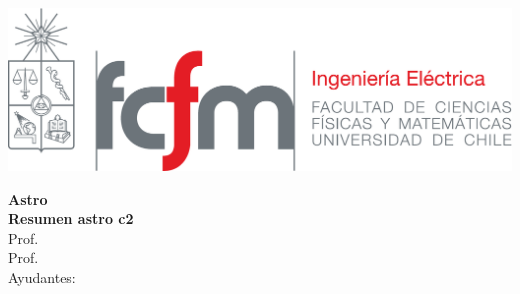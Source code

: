 \documentclass[
  11pt,
  letterpaper,
  answers
]{exam}
\begin{document}
\begin{minipage}{0.42\textwidth}
    \includegraphics[width=\textwidth]{../fcfm_die}
\end{minipage}
\begin{minipage}{0.53\textwidth}
\begin{center} 
\large\textbf{Astro}  \\
\large\textbf{Resumen astro c2} \\
\normalsize Prof.~\\
\normalsize Prof.~\\
\normalsize Ayudantes: 
\end{center}
\end{minipage}

\vspace{0.5cm}
\noindent
\vspace{.85cm}
\end{document}
